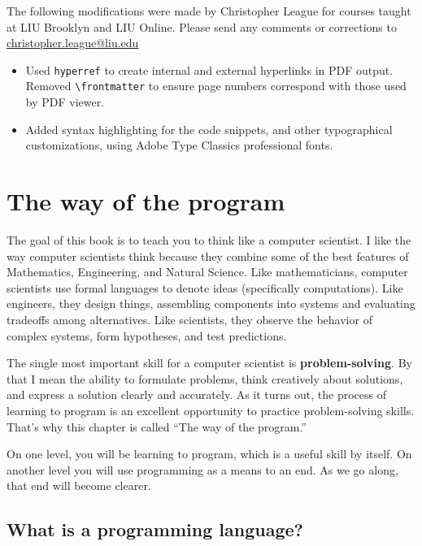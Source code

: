 \documentclass[12pt]{book}
\theoremstyle{definition}
\begin{document}
The following modifications were made by Christopher League for
courses taught at LIU Brooklyn and LIU Online. Please send any
comments or corrections to \url{christopher.league@liu.edu}

\begin{itemize}
\item Used \texttt{hyperref} to create internal and external
  hyperlinks in PDF output. Removed \verb+\frontmatter+ to ensure page
  numbers correspond with those used by PDF viewer.
\item Added syntax highlighting for the code snippets, and other
  typographical customizations, using Adobe Type Classics professional
  fonts.
\end{itemize}




\setcounter{tocdepth}{1}
\tableofcontents


\chapter{The way of the program}
\label{chap01}

The goal of this book is to teach you to think like a
computer scientist.  I like the way computer scientists think because
they combine some of the best features of Mathematics, Engineering,
and Natural Science.  Like mathematicians, computer scientists use formal
languages to denote ideas (specifically computations).  Like
engineers, they design things, assembling components into systems and
evaluating tradeoffs among alternatives.  Like scientists,
they observe the behavior of complex systems, form hypotheses, and test
predictions.

The single most important skill for a computer scientist is {\bf
problem-solving}.  By that I mean the ability to formulate problems,
think creatively about solutions, and express a solution clearly and
accurately.  As it turns out, the process of learning to program is an
excellent opportunity to practice problem-solving skills.  That's why
this chapter is called ``The way of the program.''

On one level, you will be learning to program, which is a useful
skill by itself.  On another level you will use programming
as a means to an end.  As we go along, that end will
become clearer.

\section{What is a programming language?}
\end{document}
